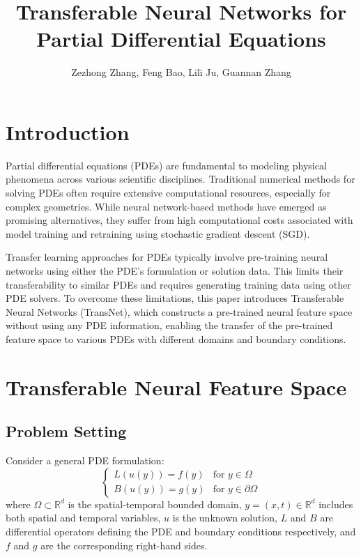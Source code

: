 \documentclass[11pt]{article}
\title{Transferable Neural Networks for Partial Differential Equations}
\author{Zezhong Zhang, Feng Bao, Lili Ju, Guannan Zhang}
\date{}
\begin{document}
\maketitle

\section{Introduction}

Partial differential equations (PDEs) are fundamental to modeling physical phenomena across various scientific disciplines. Traditional numerical methods for solving PDEs often require extensive computational resources, especially for complex geometries. While neural network-based methods have emerged as promising alternatives, they suffer from high computational costs associated with model training and retraining using stochastic gradient descent (SGD).

Transfer learning approaches for PDEs typically involve pre-training neural networks using either the PDE's formulation or solution data. This limits their transferability to similar PDEs and requires generating training data using other PDE solvers. To overcome these limitations, this paper introduces Transferable Neural Networks (TransNet), which constructs a pre-trained neural feature space without using any PDE information, enabling the transfer of the pre-trained feature space to various PDEs with different domains and boundary conditions.

\section{Transferable Neural Feature Space}

\subsection{Problem Setting}

Consider a general PDE formulation:
\begin{equation}
\begin{cases}
L(u(y)) = f(y) & \text{for } y \in \Omega \\
B(u(y)) = g(y) & \text{for } y \in \partial\Omega
\end{cases}
\end{equation}
where $\Omega \subset \mathbb{R}^d$ is the spatial-temporal bounded domain, $y = (x, t) \in \mathbb{R}^d$ includes both spatial and temporal variables, $u$ is the unknown solution, $L$ and $B$ are differential operators defining the PDE and boundary conditions respectively, and $f$ and $g$ are the corresponding right-hand sides.
\end{document}
